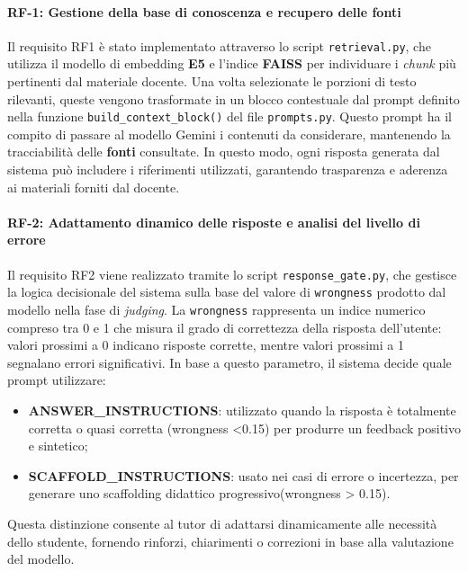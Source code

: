 \documentclass[a4paper,9pt]{article}
\begin{document}
\paragraph{RF-1: Gestione della base di conoscenza e recupero delle fonti}

Il requisito RF1 è stato implementato attraverso lo script \texttt{retrieval.py}, che utilizza il modello di embedding \textbf{E5} e l’indice \textbf{FAISS} per individuare i \textit{chunk} più pertinenti dal materiale docente.  
Una volta selezionate le porzioni di testo rilevanti, queste vengono trasformate in un blocco contestuale dal prompt definito nella funzione \texttt{build\_context\_block()} del file \texttt{prompts.py}.  
Questo prompt ha il compito di passare al modello Gemini i contenuti da considerare, mantenendo la tracciabilità delle \textbf{fonti} consultate.  
In questo modo, ogni risposta generata dal sistema può includere i riferimenti utilizzati, garantendo trasparenza e aderenza ai materiali forniti dal docente.

\paragraph{RF-2: Adattamento dinamico delle risposte e analisi del livello di errore}

Il requisito RF2 viene realizzato tramite lo script \texttt{response\_gate.py}, che gestisce la logica decisionale del sistema sulla base del valore di \texttt{wrongness} prodotto dal modello nella fase di \textit{judging}.  
La \texttt{wrongness} rappresenta un indice numerico compreso tra 0 e 1 che misura il grado di correttezza della risposta dell’utente: valori prossimi a 0 indicano risposte corrette, mentre valori prossimi a 1 segnalano errori significativi.  
In base a questo parametro, il sistema decide quale prompt utilizzare:
\begin{itemize}
	\item \textbf{ANSWER\_INSTRUCTIONS}: utilizzato quando la risposta è totalmente corretta o quasi corretta (wrongness <0.15) per produrre un feedback positivo e sintetico;
	\item \textbf{SCAFFOLD\_INSTRUCTIONS}: usato nei casi di errore o incertezza, per generare uno scaffolding didattico progressivo(wrongness > 0.15).
\end{itemize}
Questa distinzione consente al tutor di adattarsi dinamicamente alle necessità dello studente, fornendo rinforzi, chiarimenti o correzioni in base alla valutazione del modello.
\end{document}
